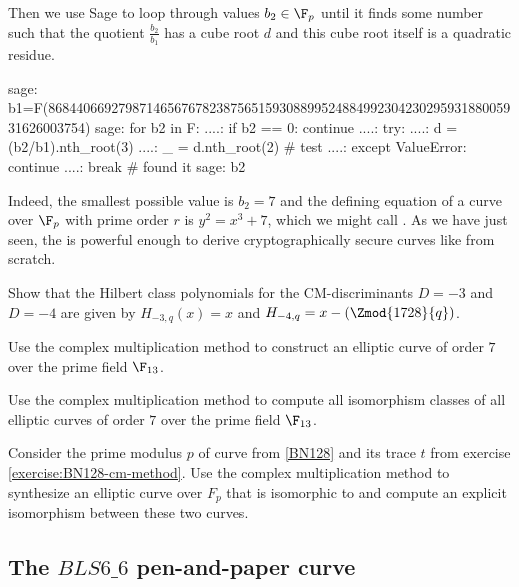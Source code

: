 \begin{example}
Then we use Sage to loop through values $b_2\in \F_p$ until it finds some number such that the quotient $\frac{b_2}{b_1}$ has a cube root $d$ and this cube root itself is a quadratic residue. 
\begin{sagecommandline}
sage: b1=F(86844066927987146567678238756515930889952488499230423029593188005931626003754)
sage: for b2 in F:
....:     if b2 == 0: continue
....:     try:
....:         d = (b2/b1).nth_root(3)
....:         _ = d.nth_root(2) # test
....:     except ValueError: continue
....:     break # found it
sage: b2
\end{sagecommandline}
Indeed, the smallest possible value is $b_2=7$ and the defining  equation of a curve over $\F_p$ with prime order $r$ is 
$
y^2 = x^3 + 7
$,
which we might call . As we have just seen, the  is powerful enough to derive cryptographically secure curves like  from scratch.
\end{example}
\begin{exercise}
\label{ex:Low_order_Hilbert_polys} Show that the Hilbert class polynomials for the CM-discriminants $D=-3$ and $D=-4$ are given by  $H_{-3,q}(x)=x$ and $H_{-4,q}= x-(\Zmod{1728}{q})$.
\end{exercise}
\begin{exercise}
Use the complex multiplication method to construct an elliptic curve of order $7$ over the prime field $\F_{13}$.
\end{exercise}
\begin{exercise}
Use the complex multiplication method to compute all isomorphism classes of all elliptic curves of order $7$ over the prime field $\F_{13}$.
\end{exercise}
\begin{exercise}
\label{exercise:BN128-cm-method}
Consider the prime modulus $p$ of curve  from \examplename{} \ref{BN128} and its trace $t$ from exercise \ref{exercise:BN128-cm-method}. Use the complex multiplication method to synthesize an elliptic curve over $F_p$ that is isomorphic to  and compute an explicit isomorphism between these two curves.
\end{exercise}
\subsection{The $BLS6\_6$ pen-and-paper curve}\label{BLS6}

